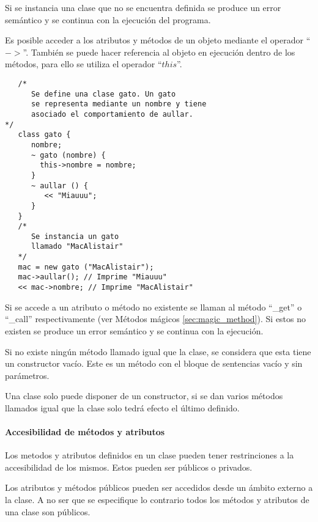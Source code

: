 Si se instancia una clase que no se encuentra definida se produce un error semántico y se continua con la ejecución del programa.

Es posible acceder a los atributos y métodos de un objeto mediante el operador ``$->$''.
También se puede hacer referencia al objeto en ejecución dentro de los métodos, para ello se utiliza el operador ``$this$''. \\

\begin{lstlisting}
   /*
      Se define una clase gato. Un gato 
      se representa mediante un nombre y tiene
      asociado el comportamiento de aullar.
*/
   class gato {
      nombre;
      ~ gato (nombre) {
        this->nombre = nombre;
      }
      ~ aullar () {
         << "Miauuu";
      }
   }
   /*
      Se instancia un gato 
      llamado "MacAlistair"
   */
   mac = new gato ("MacAlistair"); 
   mac->aullar(); // Imprime "Miauuu"
   << mac->nombre; // Imprime "MacAlistair"
\end{lstlisting}

Si se accede a un atributo o método no existente se llaman al método ``\_get'' o ``\_call'' respectivamente (ver Métodos mágicos \autoref{sec:magic_method}). Si 
estos no existen se produce un error semántico y se continua con la ejecución.

Si no existe ningún método llamado igual que la clase, se considera que esta tiene un constructor vacío. Este es
un método con el bloque de sentencias vacío y sin parámetros.

Una clase solo puede disponer de un constructor, si se dan varios métodos llamados igual que la clase solo tedrá 
efecto el último definido.

\paragraph{Accesibilidad de métodos y atributos}
Los metodos y atributos definidos en un clase pueden tener restrinciones a la accesibilidad de los mismos. Estos pueden ser públicos 
o privados.

Los atributos y métodos públicos pueden ser accedidos desde un ámbito externo a la clase. A no ser que se especifique lo contrario todos los
métodos y atributos de una clase son públicos. \\

